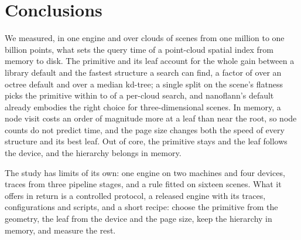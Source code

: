 \section{Conclusions}\label{sec:conclusions}

We measured, in one engine and over \nCells{} clouds of \nScenes{} scenes from one million to one billion points, what sets the query time of a point-cloud spatial index from memory to disk. The primitive and its leaf account for the whole gain between a library default and the fastest structure a search can find, a factor of \leverOctreeDefaultTuned{} over an octree default and \leverKdDefaultTuned{} over a median kd-tree; a single split on the scene's flatness picks the primitive within  to  of a per-cloud search, and nanoflann's default already embodies the right choice for three-dimensional scenes. In memory, a node visit costs an order of magnitude more at a leaf than near the root, so node counts do not predict time, and the page size changes both the speed of every structure and its best leaf. Out of core, the primitive stays and the leaf follows the device, and the hierarchy belongs in memory.

The study has limits of its own: one engine on two machines and four devices, traces from three pipeline stages, and a rule fitted on sixteen scenes. What it offers in return is a controlled protocol, a released engine with its traces, configurations and scripts, and a short recipe: choose the primitive from the geometry, the leaf from the device and the page size, keep the hierarchy in memory, and measure the rest.
